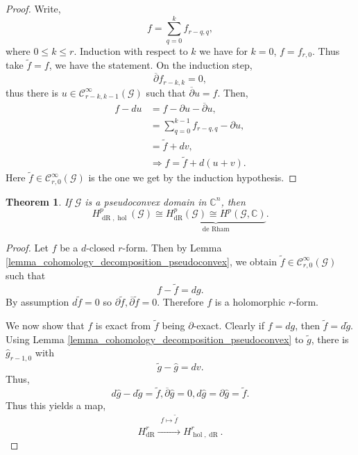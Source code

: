 \documentclass{article}
\newtheorem{theorem}{Theorem} [section]
\DeclareMathOperator{\hol}{hol}
\DeclareMathOperator{\dR}{dR}
\newcommand{\C}[0]{\mathbb{C}}
\newcommand{\G}[0]{\mathcal{G}}
\newcommand{\bd}[0]{\partial}
\newcommand{\cbd}[0]{\overline{\partial}}
\newcommand{\ck}[1]{\mathcal{C}^{#1}}
\newcommand{\cinf}[0]{\ck{\infty}}
\begin{document}
  \begin{proof}
    Write,
    \begin{equation*}
      f = \sum_{q=0}^k f_{r-q,q},
    \end{equation*}
    where $0\leq k\leq r$. Induction with respect to $k$ we have for $k=0$, $f= f_{r,0}$. Thus take $\tilde{f}=f$, we have the statement. On the induction step,
    \begin{equation*}
      \overline{\partial}f_{r-k,k}=0,
    \end{equation*}
    thus there is $u\in\cinf_{r-k,k-1}(\G)$ such that $\cbd u = f$. Then,
    \begin{align*}
      f-du & = f-\bd u-\cbd u,\\
      & = \sum_{q=0}^{k-1}f_{r-q,q}-\bd u,\\
      & = \tilde{f}+dv,\\
      &\Rightarrow f=\tilde{f}+d(u+v).
    \end{align*}
    Here $\tilde{f}\in\cinf_{r,0}(\G)$ is the one we get by the induction hypothesis.
  \end{proof}
  \begin{theorem}
    If $\G$ is a pseudoconvex domain in $\C^n$, then 
    \begin{equation*}
      H^p_{\dR,\hol}(\G)\cong \underbrace{H_{\dR}^p(\G)\cong H^p(\G,\C)}_{\text{de Rham}}.
    \end{equation*}
  \end{theorem}
  \begin{proof}
    Let $f$ be a $d$-closed $r$-form. Then by Lemma \ref{lemma_cohomology_decomposition_pseudoconvex}, we obtain $\tilde{f}\in\cinf_{r,0}(\G)$ such that 
    \begin{equation*}
    f-\tilde{f}=dg.
    \end{equation*}
    By assumption $d\tilde{f}=0$ so $\bd \tilde{f},\cbd\tilde{f}=0$. Therefore $f$ is a holomorphic $r$-form. 
    \par We now show that $f$ is exact from $\tilde{f}$ being $\bd$-exact. Clearly if $f=dg$, then $\tilde{f}=d\tilde{g}$. Using Lemma \ref{lemma_cohomology_decomposition_pseudoconvex} to $\tilde{g}$, there is $\hat{g}_{r-1,0}$ with 
    \begin{equation*}
    \tilde{g}-\hat{g}=dv.
    \end{equation*}
    Thus,
    \begin{equation*}
      d\hat{g}-d\tilde{g}=\tilde{f},\cbd\hat{g}=0,d\hat{g}=\bd\hat{g}=\tilde{f}.
    \end{equation*}
    Thus this yields a map,
    \begin{equation*}
      H_{\dR}^r\stackrel{\substack{f\mapsto \tilde{f}\\\:}}{\to} H_{\hol,\dR}^r.
    \end{equation*}
  \end{proof}
\end{document}
